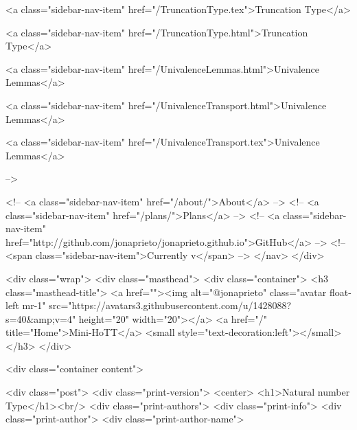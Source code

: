       
    
      
        
          <a class="sidebar-nav-item" href="/TruncationType.tex">Truncation Type</a>
        
      
    
      
        
          <a class="sidebar-nav-item" href="/TruncationType.html">Truncation Type</a>
        
      
    
      
        
          <a class="sidebar-nav-item" href="/UnivalenceLemmas.html">Univalence Lemmas</a>
        
      
    
      
        
          <a class="sidebar-nav-item" href="/UnivalenceTransport.html">Univalence Lemmas</a>
        
      
    
      
        
          <a class="sidebar-nav-item" href="/UnivalenceTransport.tex">Univalence Lemmas</a>
        
      
     -->

    <!-- <a class="sidebar-nav-item" href="/about/">About</a> -->
    <!-- <a class="sidebar-nav-item" href="/plans/">Plans</a> -->
    <!-- <a class="sidebar-nav-item" href="http://github.com/jonaprieto/jonaprieto.github.io">GitHub</a> -->
    <!-- <span class="sidebar-nav-item">Currently v</span> -->
  </nav>
</div>

    <div class="wrap">
      <div class="masthead">
        <div class="container">
          <h3 class="masthead-title">
            <a href=""><img alt="@jonaprieto" class="avatar float-left mr-1" src="https://avatars3.githubusercontent.com/u/1428088?s=40&amp;v=4" height="20" width="20"></a>
            <a href="/" title="Home">Mini-HoTT</a>
            <small style="text-decoration:left"></small>
          </h3>
        </div>
      
      <div class="container content">
        







<div class="post">
  <div class="print-version">
    <center>
      <h1>Natural number Type</h1><br/>
        <div class="print-authors">
          <div class="print-info">
            <div class="print-author">
              <div class="print-author-name">
                
